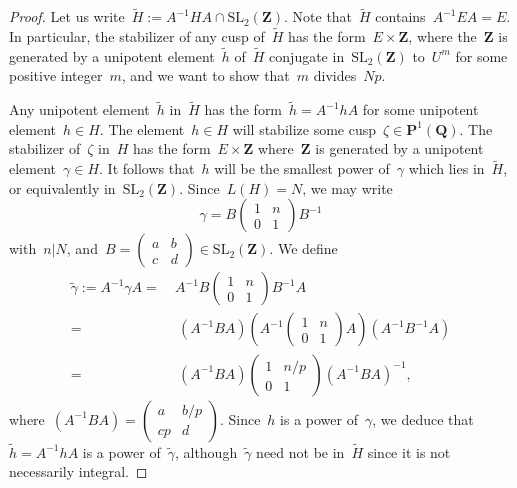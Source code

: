 \documentclass[10pt]{amsart}
\def\wh{\widetilde{h}}
\def\wH{\widetilde{H}}
\def\wgamma{\widetilde{\gamma}}
\def\Z{\mathbf{Z}}
\def\Q{\mathbf{Q}}
\theoremstyle{remark}
\numberwithin{equation}{subsection}
\def\SL{\mathrm{SL}}
\begin{document}
\begin{proof}
Let us write~$\wH:=A^{-1} H A \cap \SL_2(\Z)$. Note that~$\wH$ contains~$A^{-1}EA = E$.
In particular, the stabilizer of any cusp of~$\wH$ has the form~$E \times \Z$, where the~$\Z$
is generated by a unipotent element~$\wh$ of~$\wH$ conjugate in~$\SL_2(\Z)$
to~$U^m$ for some positive integer~$m$,
and we want to show that~$m$ divides~$Np$.

Any unipotent element~$\wh$ in~$\wH$ has the form~$\wh = A^{-1} h A$ for some unipotent
element~$h \in H$. The element~$h \in H$ will stabilize some cusp~$\zeta \in \mathbf{P}^1(\Q)$.
The stabilizer of~$\zeta$ in~$H$ has the form~$E \times \Z$ where~$\Z$ is generated by a
unipotent element~$\gamma \in H$. It follows that~$h$ will be the smallest power of~$\gamma$ which lies
in~$\wH$, or equivalently in~$\SL_2(\Z)$.
Since~$L(H) = N$, we may write
$$\gamma = B \left( \begin{matrix} 1 & n \\ 0 & 1 \end{matrix} \right) B^{-1}$$
with~$n|N$, and~$\displaystyle{B = \left( \begin{matrix} a & b \\ c & d \end{matrix} \right) \in \SL_2(\Z)}$.
We  define
$$\begin{aligned}
\wgamma:= A^{-1} \gamma A = \ &
A^{-1} B   \left( \begin{matrix} 1 & n \\ 0 & 1 \end{matrix} \right)  B^{-1} A \\
= & \  (A^{-1} B A) \left( A^{-1}  \left( \begin{matrix} 1 & n \\ 0 & 1 \end{matrix} \right)  A \right)  (A^{-1} B^{-1} A)  \\
=  & \ (A^{-1} B A)  \left( \begin{matrix} 1 & n/p \\ 0 & 1 \end{matrix} \right)  (A^{-1} B A)^{-1}, \end{aligned}
$$
where~$\displaystyle{ (A^{-1} B A)  =  \left( \begin{matrix} a & b/p \\ cp & d \end{matrix} \right)}$.
Since~$h$ is a power of~$\gamma$, we deduce that~$\wh = A^{-1} h A$ is a power of~$\wgamma$,
although~$\wgamma$ need not be in~$\wH$ since it is not necessarily integral.

\end{proof}
\end{document}
